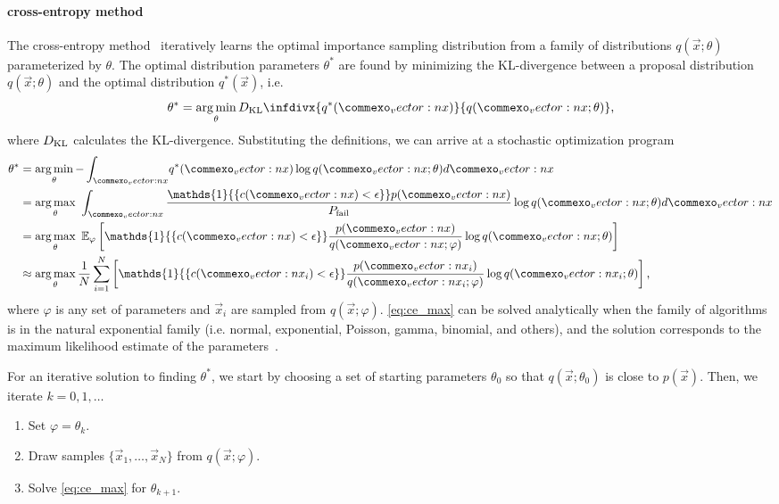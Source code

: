 \paragraph{cross-entropy method}
The cross-entropy method~\cite{rubinstein2013cross,de2005tutorial} iteratively learns the optimal importance sampling distribution from a family of distributions $q(\vec{x}; \theta)$ parameterized by $\theta$. The optimal distribution parameters $\theta^*$ are found by minimizing the KL-divergence between a proposal distribution $q(\vec{x}; \theta)$ and the optimal distribution $q^*(\vec{x})$, i.e.
\begin{equation}
    \theta^* = \argmin\limits_\theta D_{\rm KL}\infdivx{q^*(\vec{x})}{ q(\vec{x}; \theta)} \text{,}
\end{equation}
where $D_{\rm KL}$ calculates the KL-divergence. Substituting the definitions, we can arrive at a stochastic optimization program
\begin{equation}
\begin{split}
    \theta^* &= \argmin\limits_\theta {- \int_{\vec{x}}} q^*(\vec{x}) \log q(\vec{x}; \theta) d\vec{x} \\
    &= \argmax\limits_\theta \  \int_{\vec{x}} \frac{\mathds{1}{\{ c(\vec{x}) < \epsilon \}}p(\vec{x})}{P_{\rm fail}} \log q(\vec{x}; \theta) d\vec{x} \\
     &= \argmax\limits_\theta \ \mathbb{E}_{\varphi} \left[ \mathds{1}{\{ c(\vec{x}) < \epsilon \}} \frac{p(\vec{x})}{q(\vec{x}; \varphi)}\log q(\vec{x}; \theta) \right]  \\
     &\approx \argmax\limits_\theta \frac{1}{N} \sum_{i=1}^N \left[ \mathds{1}{\{ c(\vec{x}_i) < \epsilon \}} \frac{p(\vec{x}_i)}{q(\vec{x}_i; \varphi)}\log q(\vec{x}_i; \theta) \right] \label{eq:ce_max} \text{,}
\end{split}
\end{equation}
where $\varphi$ is any set of parameters and $\vec{x}_i$ are sampled from $q(\vec{x}; \varphi)$. \cref{eq:ce_max} can be solved analytically when the family of algorithms is in the natural exponential family (i.e. normal, exponential, Poisson, gamma, binomial, and others), and the solution corresponds to the maximum likelihood estimate of the parameters~\cite{de2005tutorial}.

For an iterative solution to finding $\theta^*$, we start by choosing a set of starting parameters $\theta_0$ so that $q(\vec{x}; \theta_0)$ is close to $p(\vec{x})$. Then, we iterate $k=0,1,\ldots$
\begin{enumerate}
    \item Set $\varphi = \theta_k$.
    \item Draw samples $\{ \vec{x}_1, \ldots, \vec{x}_N \}$ from $q(\vec{x};\varphi)$.
    \item Solve \cref{eq:ce_max} for $\theta_{k+1}$.
\end{enumerate}

